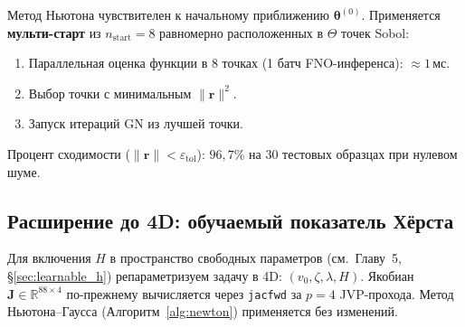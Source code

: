 Метод Ньютона чувствителен к начальному приближению $\boldsymbol\theta^{(0)}$.
Применяется \textbf{мульти-старт} из $n_{\text{start}} = 8$ равномерно
расположенных в $\Theta$ точек Sobol:

\begin{enumerate}
  \item Параллельная оценка функции в 8 точках (1 батч FNO-инференса):
        $\approx 1\,\text{мс}$.
  \item Выбор точки с минимальным $\|\mathbf{r}\|^2$.
  \item Запуск итераций GN из лучшей точки.
\end{enumerate}

Процент сходимости ($\|\mathbf{r}\| < \varepsilon_{\text{tol}}$):
$96{,}7\%$ на 30 тестовых образцах при нулевом шуме.

\subsection{Расширение до 4D: обучаемый показатель Хёрста}
\label{sec:4d_calib}

Для включения $H$ в пространство свободных параметров
(см.~Главу~5, §\ref{sec:learnable_h})
репараметризуем задачу в 4D: $(v_0, \zeta, \lambda, H)$.
Якобиан $\mathbf{J} \in \mathbb{R}^{88\times 4}$ по-прежнему вычисляется
через \texttt{jacfwd} за $p=4$ JVP-прохода. Метод Ньютона--Гаусса
(Алгоритм~\ref{alg:newton}) применяется без изменений.

